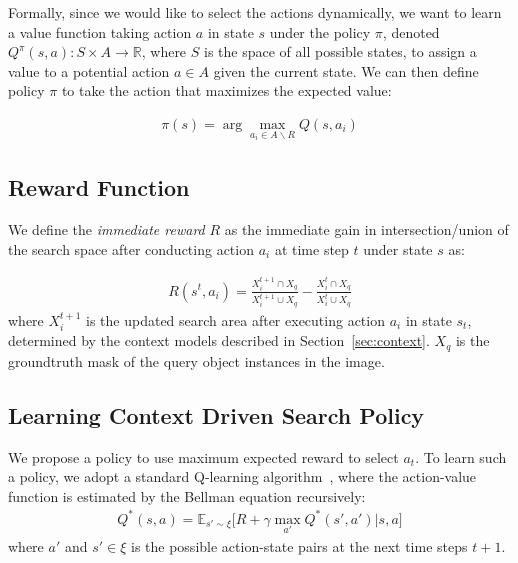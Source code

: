 Formally, since we would like to select the actions dynamically, we want to learn a value function taking action $a$ in state $s$ under the policy $\pi$, denoted $Q^\pi(s,a): S\times A \rightarrow \mathbb{R}$, where $S$ is the space of all possible states, to assign a value to a potential action $a\in A$ given the current state. We can then define policy $\pi$ to take the action that maximizes the expected value:

\begin{eqnarray}
\label{eq:pi}
\pi(s) = \arg\max_{a_i\in A\backslash R} Q(s,a_i)
\end{eqnarray}

\subsection{Reward Function}

We define the \textit{immediate reward} $R$ as the immediate gain in intersection/union of the search space after conducting action $a_i$ at time step $t$ under state $s$ as:

\begin{eqnarray}
\label{eq:imreward}
R(s^t,a_i) =  \frac{X^{t+1}_i \cap X_q}{X^{t+1}_i \cup X_q} - \frac{X^{t}_i \cap X_q}{X^{t}_i \cup X_q}
\end{eqnarray}
where $X^{t+1}_i$ is the updated search area after executing action $a_i$ in state $s_t$, determined by the context models described in Section~\ref{sec:context}. $X_q$ is the groundtruth mask of the query object instances in the image. 
  




\subsection{Learning Context Driven Search Policy}
We propose a policy to use maximum expected reward to select $a_t$. To learn such a policy, we adopt a standard Q-learning algorithm~\cite{barto1998reinforcement}, where the action-value function is estimated by the Bellman equation recursively:
\begin{eqnarray}
\label{eq:bellman}
Q^*(s,a) = \mathbb{E}_{s'\sim \xi} \big[ R + \gamma \max_{a'} Q^*(s',a')|s,a \big]
\end{eqnarray}
where $a'$ and $s'\in\xi$ is the possible action-state pairs at the next time steps $t+1$.

